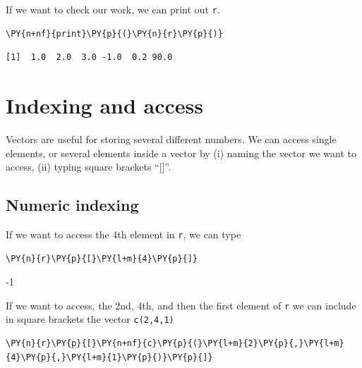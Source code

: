     If we want to check our work, we can print out \texttt{r}.

    \begin{tcolorbox}[breakable, size=fbox, boxrule=1pt, pad at break*=1mm,colback=cellbackground, colframe=cellborder]
\begin{Verbatim}[commandchars=\\\{\}]
\PY{n+nf}{print}\PY{p}{(}\PY{n}{r}\PY{p}{)}
\end{Verbatim}
\end{tcolorbox}

    \begin{Verbatim}[commandchars=\\\{\}]
[1]  1.0  2.0  3.0 -1.0  0.2 90.0
    \end{Verbatim}

    \hypertarget{indexing-and-access}{%
\section{Indexing and access}\label{indexing-and-access}}

Vectors are useful for storing several different numbers. We can access
single elements, or several elements inside a vector by (i) naming the
vector we want to access, (ii) typing square brackets ``{[}{]}''.

\hypertarget{numeric-indexing}{%
\subsection{Numeric indexing}\label{numeric-indexing}}

If we want to access the 4th element in \texttt{r}, we can type

    \begin{tcolorbox}[breakable, size=fbox, boxrule=1pt, pad at break*=1mm,colback=cellbackground, colframe=cellborder]
\begin{Verbatim}[commandchars=\\\{\}]
\PY{n}{r}\PY{p}{[}\PY{l+m}{4}\PY{p}{]}
\end{Verbatim}
\end{tcolorbox}

    -1

    
    If we want to access, the 2nd, 4th, and then the first element of
\texttt{r} we can include in square brackets the vector
\texttt{c(2,4,1)}

    \begin{tcolorbox}[breakable, size=fbox, boxrule=1pt, pad at break*=1mm,colback=cellbackground, colframe=cellborder]
\begin{Verbatim}[commandchars=\\\{\}]
\PY{n}{r}\PY{p}{[}\PY{n+nf}{c}\PY{p}{(}\PY{l+m}{2}\PY{p}{,}\PY{l+m}{4}\PY{p}{,}\PY{l+m}{1}\PY{p}{)}\PY{p}{]}
\end{Verbatim}
\end{tcolorbox}

